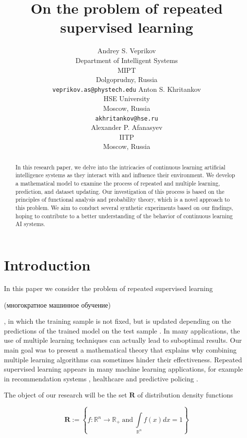 \documentclass{article}
\title{On the problem of repeated supervised learning}
\author{
    Andrey S. Veprikov\\
	Department of Intelligent Systems\\
	MIPT\\
	Dolgoprudny, Russia \\
	\texttt{veprikov.as@phystech.edu} 
    \And
    Anton S. Khritankov\\
    HSE University\\
    Moscow, Russia\\
    \texttt{akhritankov@hse.ru}\\
    \And
    Alexander P. Afanasyev \\
    IITP\\
    Moscow, Russia}
\date{}
\begin{document}
\maketitle

\begin{abstract}

    In this research paper, we delve into the intricacies of continuous learning artificial intelligence systems as they interact with and influence their environment. We develop a mathematical model to examine the process of repeated and multiple learning, prediction, and dataset updating. Our investigation of this process is based on the principles of functional analysis and probability theory, which is a novel approach to this problem. We aim to conduct several synthetic experiments based on our findings, hoping to contribute to a better understanding of the behavior of continuous learning AI systems.

\end{abstract}



\section{Introduction} \label{Introduction}

    In this paper we consider the problem of repeated supervised learning \begin{otherlanguage}{russian}(многократное машинное обучение)\end{otherlanguage}, in which the training sample is not fixed, but is updated depending on the predictions of the trained model on the test sample \cite{ma2020machine, khritankov2021existence, jiang2019degenerate}. In many applications, the use of multiple learning techniques can actually lead to suboptimal results. Our main goal was to present a mathematical theory that explains why combining multiple learning algorithms can sometimes hinder their effectiveness. Repeated supervised learning appears in many machine learning applications, for example in recommendation systems \cite{khritankov2021existence, sinha2016deconvolving}, healthcare \cite{adam2020hidden} and predictive policing \cite{ensign2018runaway}. 

    The object of our research will be the set $\mathbf{R}$ of distribution density functions

    \begin{equation}
        \label{R}
        \mathbf{R} := \left\{f : \mathbb{R}^n \rightarrow \mathbb{R}_+ ~\text{and}~ \int\limits_{\mathbb{R}^n}f(x)dx = 1\right\}
    \end{equation}
\end{document}
